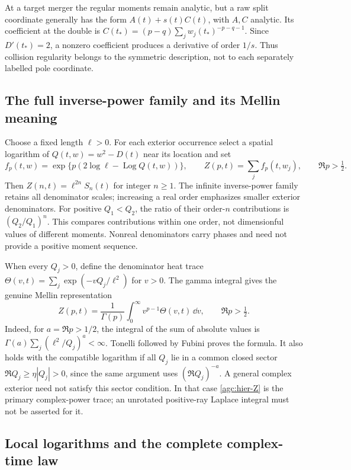 At a target merger the regular moments remain analytic, but a raw
split coordinate generally has the form $A(t)+s(t)C(t)$, with
$A,C$ analytic. Its coefficient at the double is
$C(t_*)=(p-q)\sum_jw_j(t_*)^{-p-q-1}$.
Since $D'(t_*)=2$, a nonzero coefficient produces a derivative of
order $1/s$. Thus collision regularity belongs to the symmetric
description, not to each separately labelled pole coordinate.

\subsection{The full inverse-power family and its Mellin meaning}

Choose a fixed length $\ell>0$. For each exterior occurrence select
a spatial logarithm of $Q(t,w)=w^2-D(t)$ near its location and set
\begin{equation}
 f_p(t,w)=\exp\{p(2\log\ell-\operatorname{Log}Q(t,w))\},\qquad
 Z(p,t)=\sum_j f_p(t,w_j),\qquad \Re p>\tfrac12.
 \label{agc:hier-Z}
\end{equation}
Then $Z(n,t)=\ell^{2n}S_n(t)$ for integer $n\ge1$.
The infinite inverse-power family retains all denominator scales;
increasing a real order emphasizes smaller exterior denominators.
For positive $Q_1<Q_2$, the ratio of their order-$n$ contributions
is $(Q_2/Q_1)^n$. This compares contributions within one order,
not dimensionful values of different moments. Nonreal denominators
carry phases and need not provide a positive moment sequence.

When every $Q_j>0$, define the denominator heat trace
$\Theta(v,t)=\sum_j\exp(-vQ_j/\ell^2)$ for $v>0$. The gamma
integral gives the genuine Mellin representation
\begin{equation}
 Z(p,t)=\frac1{\Gamma(p)}\int_0^\infty
                         v^{p-1}\Theta(v,t)\,\dd v,
                         \qquad \Re p>\tfrac12.
 \label{agc:hier-Mellin}
\end{equation}
Indeed, for $a=\Re p>1/2$, the integral of the sum of absolute
values is $\Gamma(a)\sum_j(\ell^2/Q_j)^a<\infty$.
Tonelli followed by Fubini proves the formula. It also holds with
the compatible logarithm if all $Q_j$ lie in a common closed sector
$\Re Q_j\ge\eta|Q_j|>0$, since the same argument uses
$(\Re Q_j)^{-a}$. A general complex exterior need not satisfy this
sector condition. In that case \eqref{agc:hier-Z} is the primary
complex-power trace; an unrotated positive-ray Laplace integral
must not be asserted for it.

\subsection{Local logarithms and the complete complex-time law}

